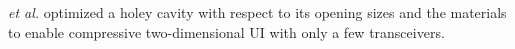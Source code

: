 \emph{et al.} \cite{article:Ghanbarzadeh-DagheyanSensors2018} optimized
a holey cavity with
respect to
its opening sizes and
the materials to enable
compressive two-dimensional \ac{UI} with
only a few transceivers.
